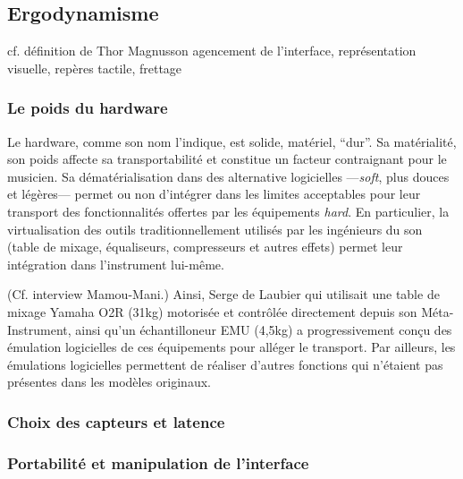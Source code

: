 \subsection{Ergodynamisme}
cf. définition de Thor Magnusson
agencement de l’interface, représentation visuelle, repères tactile, frettage

\subsubsection{Le poids du hardware}

\noindent Le hardware, comme son nom l'indique, est solide, matériel, ``dur''. Sa matérialité, son poids affecte sa transportabilité et constitue un facteur contraignant pour le musicien. Sa dématérialisation dans des alternative logicielles —\textit{soft}, plus douces et légères— permet ou non d'intégrer dans les limites acceptables pour leur transport des fonctionnalités offertes par les équipements \textit{hard}.
En particulier, la virtualisation des outils traditionnellement utilisés par les ingénieurs du son (table de mixage, équaliseurs, compresseurs et autres effets) permet leur intégration dans l'instrument lui-même.

(Cf. interview Mamou-Mani.)
Ainsi, Serge de Laubier qui utilisait une table de mixage Yamaha O2R (31kg) motorisée et contrôlée directement depuis son Méta-Instrument, ainsi qu'un échantilloneur EMU (4,5kg) a progressivement conçu des émulation logicielles de ces équipements pour alléger le transport. Par ailleurs, les émulations logicielles permettent de réaliser d'autres fonctions qui n'étaient pas présentes dans les modèles originaux.


\subsubsection{Choix des capteurs et latence}




\subsubsection{Portabilité et manipulation de l'interface}

